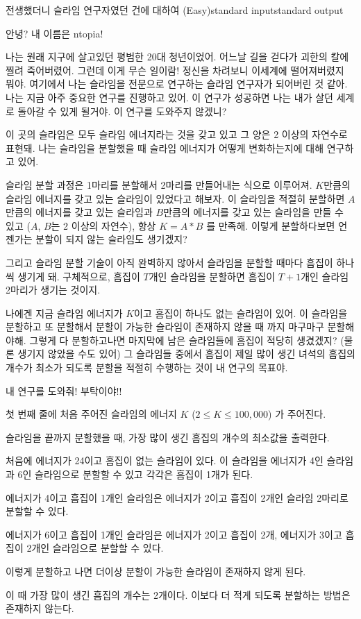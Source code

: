 \begin{problem}{전생했더니 슬라임 연구자였던 건에 대하여 (Easy)}{standard input}{standard output}

안녕? 내 이름은 ntopia!

나는 원래 지구에 살고있던 평범한 20대 청년이었어. 어느날 길을 걷다가 괴한의 칼에 찔려
죽어버렸어. 그런데 이게 무슨 일이람! 정신을 차려보니 이세계에 떨어져버렸지 뭐야.
여기에서 나는 슬라임을 전문으로 연구하는 슬라임 연구자가 되어버린 것 같아.
나는 지금 아주 중요한 연구를 진행하고 있어. 이 연구가 성공하면 나는 내가 살던 세계로
돌아갈 수 있게 될거야. 이 연구를 도와주지 않겠니?

이 곳의 슬라임은 모두 슬라임 에너지라는 것을 갖고 있고 그 양은 2 이상의 자연수로 표현돼.
나는 슬라임을 분할했을 때 슬라임 에너지가 어떻게 변화하는지에 대해 연구하고 있어.

슬라임 분할 과정은 1마리를 분할해서 2마리를 만들어내는 식으로 이루어져.
$K$만큼의 슬라임 에너지를 갖고 있는 슬라임이 있었다고 해보자. 이 슬라임을 적절히 분할하면
$A$만큼의 에너지를 갖고 있는 슬라임과
$B$만큼의 에너지를 갖고 있는 슬라임을 만들 수 있고 ($A$, $B$는 2 이상의 자연수),
항상 $K = A * B$ 를 만족해.
이렇게 분할하다보면 언젠가는 분할이 되지 않는 슬라임도 생기겠지?

그리고 슬라임 분할 기술이 아직 완벽하지 않아서 슬라임을 분할할 때마다
흠집이 하나씩 생기게 돼. 구체적으로, 흠집이 $T$개인 슬라임을 분할하면
흠집이 $T+1$개인 슬라임 2마리가 생기는 것이지.

나에겐 지금 슬라임 에너지가 $K$이고 흠집이 하나도 없는 슬라임이 있어.
이 슬라임을 분할하고 또 분할해서 분할이 가능한 슬라임이 존재하지 않을 때 까지 마구마구 분할해야해.
그렇게 다 분할하고나면 마지막에 남은 슬라임들에 흠집이 적당히 생겼겠지?
(물론 생기지 않았을 수도 있어)
그 슬라임들 중에서 흠집이 제일 많이 생긴 녀석의 흠집의 개수가 최소가 되도록
분할을 적절히 수행하는 것이 내 연구의 목표야.

내 연구를 도와줘! 부탁이야!!

\InputFile
첫 번째 줄에 처음 주어진 슬라임의 에너지 $K$ ($2 \le K \le 100,000$) 가 주어진다.

\OutputFile
슬라임을 끝까지 분할했을 때, 가장 많이 생긴 흠집의 개수의 최소값을 출력한다.

\Example

\begin{example}
%
%
%
\end{example}

\Notes
처음에 에너지가 24이고 흠집이 없는 슬라임이 있다.
이 슬라임을 에너지가 4인 슬라임과 6인 슬라임으로 분할할 수 있고 각각은 흠집이 1개가 된다.

에너지가 4이고 흠집이 1개인 슬라임은 에너지가 2이고 흠집이 2개인 슬라임 2마리로 분할할 수 있다.

에너지가 6이고 흠집이 1개인 슬라임은 에너지가 2이고 흠집이 2개, 에너지가 3이고 흠집이 2개인 슬라임으로 분할할 수 있다.

이렇게 분할하고 나면 더이상 분할이 가능한 슬라임이 존재하지 않게 된다.

이 때 가장 많이 생긴 흠집의 개수는 2개이다. 이보다 더 적게 되도록 분할하는 방법은 존재하지 않는다.

\end{problem}
